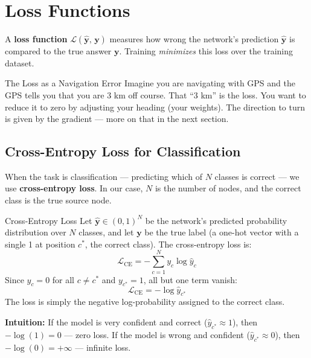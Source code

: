 \section{Loss Functions}
\label{sec:loss_functions}

A \textbf{loss function} $\mathcal{L}(\hat{\mathbf{y}},\, \mathbf{y})$ measures how wrong the network's prediction $\hat{\mathbf{y}}$ is compared to the true answer $\mathbf{y}$. Training \emph{minimizes} this loss over the training dataset.

\begin{analogybox}{The Loss as a Navigation Error}
Imagine you are navigating with GPS and the GPS tells you that you are 3 km off course. That ``3 km'' is the loss. You want to reduce it to zero by adjusting your heading (your weights). The direction to turn is given by the gradient --- more on that in the next section.
\end{analogybox}

\subsection{Cross-Entropy Loss for Classification}

When the task is classification --- predicting which of $N$ classes is correct --- we use \textbf{cross-entropy loss}. In our case, $N$ is the number of nodes, and the correct class is the true source node.

\begin{mathbox}{Cross-Entropy Loss}
Let $\hat{\mathbf{y}} \in (0,1)^N$ be the network's predicted probability distribution over $N$ classes, and let $\mathbf{y}$ be the true label (a one-hot vector with a single 1 at position $c^*$, the correct class). The cross-entropy loss is:
\begin{equation}
    \mathcal{L}_{\text{CE}} = -\sum_{c=1}^{N} y_c \log \hat{y}_c
\end{equation}
Since $y_c = 0$ for all $c \ne c^*$ and $y_{c^*} = 1$, all but one term vanish:
\begin{equation}
    \mathcal{L}_{\text{CE}} = -\log \hat{y}_{c^*}
\end{equation}
The loss is simply the negative log-probability assigned to the correct class.

\textbf{Intuition:} If the model is very confident and correct ($\hat{y}_{c^*} \approx 1$), then $-\log(1) = 0$ --- zero loss. If the model is wrong and confident ($\hat{y}_{c^*} \approx 0$), then $-\log(0) = +\infty$ --- infinite loss.
\end{mathbox}

